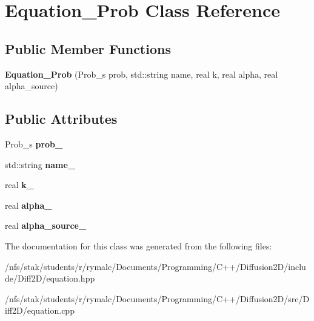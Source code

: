 \hypertarget{classEquation__Prob}{\section{Equation\+\_\+\+Prob Class Reference}
\label{classEquation__Prob}
}
\subsection*{Public Member Functions}
\begin{DoxyCompactItemize}
\item 
\hypertarget{classEquation__Prob_a8eda60c6fe1e289ac5384cdf530cb47b}{{\bfseries Equation\+\_\+\+Prob} (Prob\+\_\+s prob, std\+::string name, real k, real alpha, real alpha\+\_\+source)}\label{classEquation__Prob_a8eda60c6fe1e289ac5384cdf530cb47b}

\end{DoxyCompactItemize}
\subsection*{Public Attributes}
\begin{DoxyCompactItemize}
\item 
\hypertarget{classEquation__Prob_a8761e4cfb7c9c934d1827a91625d7643}{Prob\+\_\+s {\bfseries prob\+\_\+}}\label{classEquation__Prob_a8761e4cfb7c9c934d1827a91625d7643}

\item 
\hypertarget{classEquation__Prob_af9c78d17a5b69f44175e95cef57c05d3}{std\+::string {\bfseries name\+\_\+}}\label{classEquation__Prob_af9c78d17a5b69f44175e95cef57c05d3}

\item 
\hypertarget{classEquation__Prob_add8db541a0ff4a402b95e2a70a3ad7a8}{real {\bfseries k\+\_\+}}\label{classEquation__Prob_add8db541a0ff4a402b95e2a70a3ad7a8}

\item 
\hypertarget{classEquation__Prob_ab8c2b9f46d6d9393c6556d0e734aae61}{real {\bfseries alpha\+\_\+}}\label{classEquation__Prob_ab8c2b9f46d6d9393c6556d0e734aae61}

\item 
\hypertarget{classEquation__Prob_aeb3f0d6aa0ffbbd16bc0866f177ec13e}{real {\bfseries alpha\+\_\+source\+\_\+}}\label{classEquation__Prob_aeb3f0d6aa0ffbbd16bc0866f177ec13e}

\end{DoxyCompactItemize}


The documentation for this class was generated from the following files\+:\begin{DoxyCompactItemize}
\item 
/nfs/stak/students/r/rymalc/\+Documents/\+Programming/\+C++/\+Diffusion2\+D/include/\+Diff2\+D/equation.\+hpp\item 
/nfs/stak/students/r/rymalc/\+Documents/\+Programming/\+C++/\+Diffusion2\+D/src/\+Diff2\+D/equation.\+cpp\end{DoxyCompactItemize}

